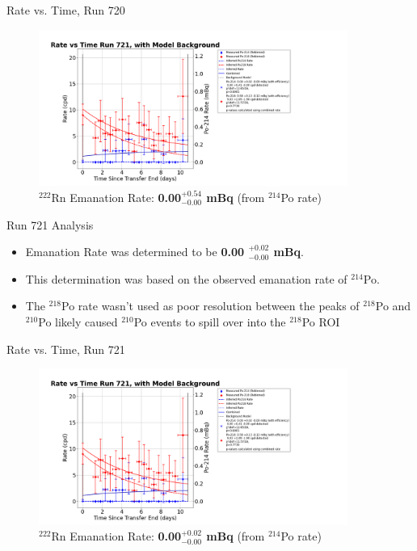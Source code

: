 \documentclass[aspectratio=169]{beamer}
\begin{document}
\begin{frame}{Rate vs. Time, Run 720}
\label{RvT_720}
    \begin{figure}
        \begin{center}
            \includegraphics[width=0.9\textwidth]
            {assets/720/RvT.png}
            \caption{$^{222}$Rn Emanation Rate: 
            \textbf{0.00$^{+0.54}_{-0.00}$ mBq} (from $^{214}$Po rate)}
        \end{center}
    \end{figure}    
\end{frame}

\begin{frame}{Run 721 Analysis}
    \begin{itemize}
        \item Emanation Rate was determined to be \textbf{0.00 $^{+0.02}_{-0.00}$ mBq}.
        \item This determination was based on the observed emanation rate of $^{214}$Po.
        \item The $^{218}$Po rate wasn't used as poor resolution between the peaks of \@
            $^{218}$Po and $^{210}$Po likely caused $^{210}$Po events to spill over\@
            into the $^{218}$Po ROI
    \end{itemize}

    \hyperlink{721_Backup}{}
\end{frame}

\begin{frame}{Rate vs. Time, Run 721}
\label{RvT_721}
    \begin{figure}
        \begin{center}
            \includegraphics[width=0.9\textwidth]
            {assets/721/RvT.png}
            \caption{$^{222}$Rn Emanation Rate: 
            \textbf{0.00$^{+0.02}_{-0.00}$ mBq} (from $^{214}$Po rate)}
        \end{center}
    \end{figure}    
\end{frame}
\end{document}
